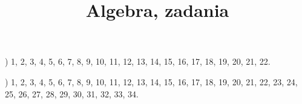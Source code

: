 \documentclass[a4paper,11pt]{article}
\title{Algebra, zadania}
\begin{document}





\maketitle %







\noindent
{}) 1, 2, 3, 4, 5, 6, 7, 8, 9, 10, 11, 12, 13, 14, 15, 16,
17, 18, 19, 20, 21, 22.

\vspace{\spaceFour}



\noindent
{}) 1, 2, 3, 4, 5, 6, 7, 8, 9, 10, 11, 12, 13, 14, 15, 16,
17, 18, 19, 20, 21, 22, 23, 24, 25, 26, 27, 28, 29, 30, 31, 32, 33, 34.

\vspace{\spaceFour}









\end{document}
